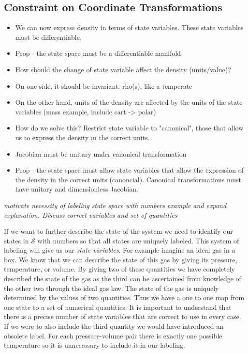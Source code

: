 \documentclass{article}
\begin{document}
\subsection{Constraint on Coordinate Transformations}	
\begin{itemize}

\item We can now express density in terms of state variables. These state variables must be differentiable.

\item Prop - the state space must be a differentiable manifold

\item How should the change of state variable affect the density (units/value)?

\item On one side, it should be invariant. rho(s), like a temperate

\item On the other hand, units of the density are affected by the units of the state variables (mass example, include cart -> polar)

\item How do we solve this? Restrict state variable to "canonical", those that allow us to express the density in the correct units.

\item Jacobian must be unitary under canonical transformation

\item Prop - the state space must allow state variables that allow the expression of the density in the correct units (canoncial). Canonical transformations must have unitary and dimensionless Jacobian.
\end{itemize}


	\emph{motivate necessity of labeling state space with numbers}
	\emph{example and expand explanation. Discuss correct variables and set of quantities} 
	
	If we want to further describe the state of the system we need to identify our states in $\mathcal{S}$ with numbers so that all states are uniquely labeled. This system of labeling will give us our \textit{state variables}. For example imagine an ideal gas in a box. We know that we can describe the state of this gas by giving its pressure, temperature, or volume. By giving two of these quantities we have completely described the state of the gas as the third can be ascertained from knowledge of the other two through the ideal gas law. The state of the gas is uniquely determined by the values of two quantities. Thus we have a one to one map from one state to a set of numerical quantities. It is important to understand that there is a precise number of state variables that are correct to use in every case. If we were to also include the third quantity we would have introduced an obsolete label. For each pressure-volume pair there is exactly one possible temperature so it is unnecessary to include it in our labeling. 
\end{document}
